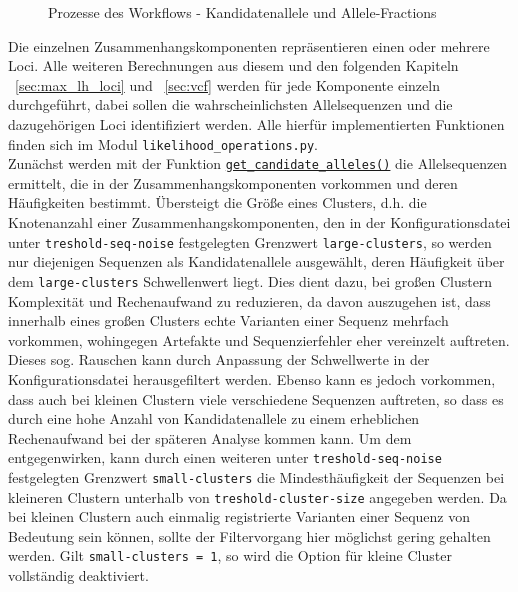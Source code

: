 \begin{figure}[h]
\begin{center}
		\caption{Prozesse des Workflows - Kandidatenallele und Allele-Fractions \cite{tikz_schema}}
		\label{fig:workflow_all}
	\end{center}
\end{figure}

Die einzelnen Zusammenhangskomponenten repräsentieren einen oder mehrere Loci. Alle weiteren Berechnungen aus diesem und den folgenden Kapiteln ~\ref{sec:max_lh_loci} und ~\ref{sec:vcf} werden für jede Komponente einzeln durchgeführt, dabei sollen die wahrscheinlichsten Allelsequenzen und die dazugehörigen Loci identifiziert werden. Alle hierfür implementierten Funktionen finden sich im Modul \lstinline|likelihood_operations.py|. \\

Zunächst werden mit der Funktion \hyperref[schritt6]{\lstinline|get_candidate_alleles()|\label{schritt6txt}} die Allelsequenzen ermittelt, die in der Zusammenhangskomponenten vorkommen und deren Häufigkeiten bestimmt. Übersteigt die Größe eines Clusters, d.h. die Knotenanzahl einer Zusammenhangskomponenten, den in der Konfigurationsdatei unter \lstinline|treshold-seq-noise| festgelegten Grenzwert \lstinline|large-clusters|, so werden nur diejenigen Sequenzen als Kandidatenallele ausgewählt, deren Häufigkeit über dem \lstinline|large-clusters| Schwellenwert liegt. Dies dient dazu, bei großen Clustern Komplexität und Rechenaufwand zu reduzieren, da davon auszugehen ist, dass innerhalb eines großen Clusters echte Varianten einer Sequenz mehrfach vorkommen, wohingegen Artefakte und Sequenzierfehler eher vereinzelt auftreten. Dieses sog. Rauschen kann durch Anpassung der Schwellwerte in der Konfigurationsdatei herausgefiltert werden. Ebenso kann es jedoch vorkommen, dass auch bei kleinen Clustern viele verschiedene Sequenzen auftreten, so dass es durch eine hohe Anzahl von Kandidatenallele zu einem erheblichen Rechenaufwand bei der späteren Analyse kommen kann. Um dem entgegenwirken, kann durch einen weiteren unter \lstinline|treshold-seq-noise| festgelegten Grenzwert \lstinline|small-clusters| die Mindesthäufigkeit der Sequenzen bei kleineren Clustern unterhalb von \lstinline|treshold-cluster-size| angegeben werden. Da bei kleinen Clustern auch einmalig registrierte Varianten einer Sequenz von Bedeutung sein können, sollte der Filtervorgang hier möglichst gering gehalten werden. Gilt \lstinline|small-clusters = 1|, so wird die Option für kleine Cluster vollständig deaktiviert. \\

